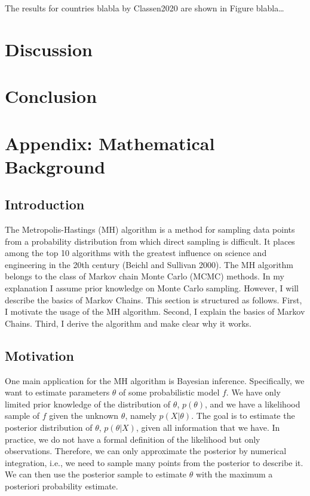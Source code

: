 \documentclass[12pt,english,a4paper,oneside]{article}
\theoremstyle{definition}
\theoremstyle{definition}
\theoremstyle{definition}
\theoremstyle{definition}
\theoremstyle{remark}
\begin{document}
The results for countries blabla by Classen2020 are shown in Figure blabla\ldots{}

\hypertarget{discussion}{%
\section{Discussion}\label{discussion}}

\hypertarget{conclusion}{%
\section{Conclusion}\label{conclusion}}

\hypertarget{appendix-mathematical-background}{%
\section{Appendix: Mathematical Background}\label{appendix-mathematical-background}}

\hypertarget{introduction-1}{%
\subsection{Introduction}\label{introduction-1}}

The Metropolis-Hastings (MH) algorithm is a method for sampling data points from a probability distribution from which direct sampling is difficult. It places among the top 10 algorithms with the greatest influence on science and engineering in the 20th century (Beichl and Sullivan 2000). The MH algorithm belongs to the class of Markov chain Monte Carlo (MCMC) methods. In my explanation I assume prior knowledge on Monte Carlo sampling. However, I will describe the basics of Markov Chains. This section is structured as follows. First, I motivate the usage of the MH algorithm. Second, I explain the basics of Markov Chains. Third, I derive the algorithm and make clear why it works.

\hypertarget{motivation}{%
\subsection{Motivation}\label{motivation}}

One main application for the MH algorithm is Bayesian inference. Specifically, we want to estimate parameters \(\theta\) of some probabilistic model \(f\). We have only limited prior knowledge of the distribution of \(\theta\), \(p(\theta)\), and we have a likelihood sample of \(f\) given the unknown \(\theta\), namely \(p(X|\theta)\). The goal is to estimate the posterior distribution of \(\theta\), \(p(\theta|X)\), given all information that we have. In practice, we do not have a formal definition of the likelihood but only observations. Therefore, we can only approximate the posterior by numerical integration, i.e., we need to sample many points from the posterior to describe it. We can then use the posterior sample to estimate \(\theta\) with the maximum a posteriori probability estimate.\newline
\end{document}
